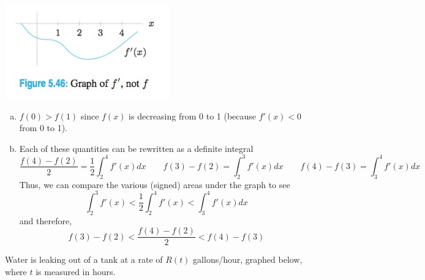 \documentclass[11pt]{exam}
\begin{document}
\begin{questions}
\begin{multicols}{2}
\columnbreak
\includegraphics[width=2.8in]{no3334graph.jpg}
\end{multicols}
\begin{solution}
  \begin{enumerate}[(a)]
  \item \(f(0) > f(1)\) since \(f(x)\) is decreasing from 0 to 1
    (because \(f'(x) < 0\) from 0 to 1).
  \item Each of these quantities can be rewritten as a definite
    integral \[
      \frac{f(4)-f(2)}{2} = \frac{1}{2} \int_2^4 f'(x) dx \qquad
      f(3)-f(2) = \int_2^3 f'(x) dx \qquad f(4) - f(3) =
      \int_3^4 f'(x) dx
    \]
    Thus, we can compare the various (signed) areas under the graph to see \[
      \int_2^3 f'(x) < \frac{1}{2} \int_2^4 f'(x) < \int_3^4 f'(x) dx
    \]
    and therefore, \[
      f(3) - f(2) < \frac{f(4)-f(2)}{2} < f(4) - f(3)
    \]
  \end{enumerate}
\end{solution}
\question Water is leaking out of a tank at a rate of \(R(t)\)
  gallons/hour, graphed below, where \(t\) is measured in hours.
  \begin{multicols}{2}
\end{multicols}
\end{questions}
\end{document}
